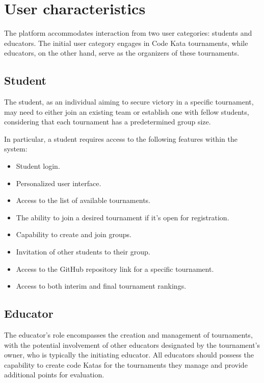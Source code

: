 \documentclass[12pt, a4paper]{report}
\begin{document}
    \section{User characteristics}
    The platform accommodates interaction from two user categories: students and educators. The initial user category engages in Code Kata tournaments, while educators, 
    on the other hand, serve as the organizers of these tournaments.
    \subsection{Student}
    The student, as an individual aiming to secure victory in a specific tournament, may need to either join an existing team or establish one with fellow students, 
    considering that each tournament has a predetermined group size. 

    In particular, a student requires access to the following features within the system:
    \begin{itemize}
        \item Student login.
        \item Personalized user interface. 
        \item Access to the list of available tournaments.
        \item The ability to join a desired tournament if it's open for registration.
        \item Capability to create and join groups.
        \item Invitation of other students to their group.
        \item Access to the GitHub repository link for a specific tournament.
        \item Access to both interim and final tournament rankings.
    \end{itemize}

    \subsection{Educator}
    The educator's role encompasses the creation and management of tournaments, with the potential involvement of other educators designated by the tournament's owner, 
    who is typically the initiating educator. All educators should possess the capability to create code Katas for the tournaments they manage and provide additional 
    points for evaluation.
\end{document}
